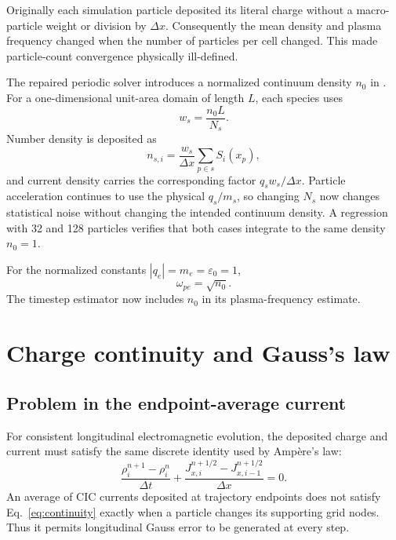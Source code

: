 \documentclass[11pt,a4paper]{article}
\newcommand{\epsz}{\varepsilon_0}
\begin{document}
Originally each simulation particle deposited its literal charge without a
macro-particle weight or division by $\Delta x$.  Consequently the mean density
and plasma frequency changed when the number of particles per cell changed.
This made particle-count convergence physically ill-defined.

The repaired periodic solver introduces a normalized continuum density $n_0$
in .  For a one-dimensional unit-area domain of length
$L$, each species uses
\begin{equation}
  w_s=\frac{n_0L}{N_s}.
\end{equation}
Number density is deposited as
\begin{equation}
  n_{s,i}=\frac{w_s}{\Delta x}
      \sum_{p\in s}S_i(x_p),
\end{equation}
and current density carries the corresponding factor
$q_sw_s/\Delta x$.  Particle acceleration continues to use the physical
$q_s/m_s$, so changing $N_s$ now changes statistical noise without changing
the intended continuum density.  A regression with 32 and 128 particles
verifies that both cases integrate to the same density $n_0=1$.

For the normalized constants $|q_e|=m_e=\epsz=1$,
\begin{equation}
  \omega_{pe}=\sqrt{n_0}.
\end{equation}
The timestep estimator now includes $n_0$ in its plasma-frequency estimate.

\section{Charge continuity and Gauss's law}

\subsection{Problem in the endpoint-average current}

For consistent longitudinal electromagnetic evolution, the deposited charge
and current must satisfy the same discrete identity used by Amp\`ere's law:
\begin{equation}
  \frac{\rho_i^{n+1}-\rho_i^n}{\Delta t}
  +\frac{J_{x,i}^{n+1/2}-J_{x,i-1}^{n+1/2}}{\Delta x}=0.
  \label{eq:continuity}
\end{equation}
An average of CIC currents deposited at trajectory endpoints does not satisfy
Eq.~\eqref{eq:continuity} exactly when a particle changes its supporting grid
nodes.  Thus it permits longitudinal Gauss error to be generated at every
step.
\end{document}
